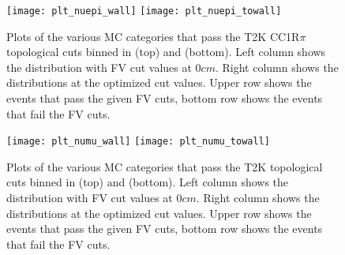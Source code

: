 \begin{figure}[h]
  \begin{center}
    \texttt{[image: plt\_nuepi\_wall]}
    \texttt{[image: plt\_nuepi\_towall]}
  \end{center}
  \caption{Plots of the various MC categories that pass the T2K \nue CC1R$\pi$
  topological cuts binned in \wall (top) and \towall (bottom).  Left
  column shows the distribution with FV cut values at $0 cm$.  Right column
  shows the distributions at the optimized cut values. Upper row shows the
  events that pass the given FV cuts, bottom row shows the events that fail the
  FV cuts. 
  }
  \label{fig:nue1rpitowall}
\end{figure}


\begin{figure}[h]
  \begin{center}
    \texttt{[image: plt\_numu\_wall]}
    \texttt{[image: plt\_numu\_towall]}
  \end{center}
  \caption{Plots of the various MC categories that pass the T2K \numu
  topological cuts binned in \wall (top) and \towall (bottom).  Left
  column shows the distribution with FV cut values at $0 cm$.  Right column
  shows the distributions at the optimized cut values. Upper row shows the
  events that pass the given FV cuts, bottom row shows the events that fail the
  FV cuts. 
  }
  \label{fig:numutowall}
\end{figure}




